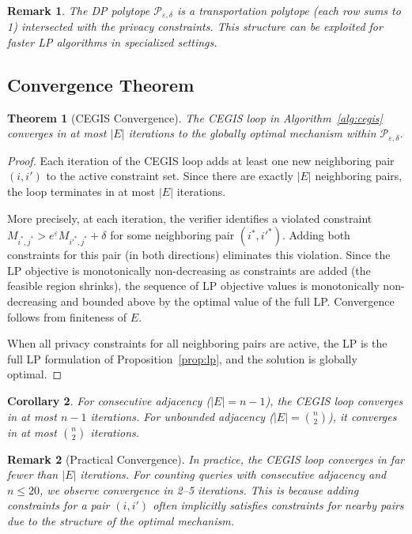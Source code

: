 \documentclass[11pt,a4paper]{article}
\newcommand{\eps}{\varepsilon}
\newcommand{\cP}{\mathcal{P}}
\newtheorem{theorem}{Theorem}[section]
\newtheorem{corollary}[theorem]{Corollary}
\newtheorem{remark}{Remark}[section]
\begin{document}
\begin{remark}
The DP polytope $\cP_{\eps,\delta}$ is a \emph{transportation polytope}
(each row sums to 1) intersected with the privacy constraints.  This structure
can be exploited for faster LP algorithms in specialized settings.
\end{remark}

\subsection{Convergence Theorem}
\label{subsec:convergence}

\begin{theorem}[CEGIS Convergence]
\label{thm:convergence}
The CEGIS loop in Algorithm~\ref{alg:cegis} converges in at most $|E|$
iterations to the globally optimal mechanism within $\cP_{\eps,\delta}$.
\end{theorem}

\begin{proof}
Each iteration of the CEGIS loop adds at least one new neighboring pair
$(i, i')$ to the active constraint set.  Since there are exactly $|E|$
neighboring pairs, the loop terminates in at most $|E|$ iterations.

More precisely, at each iteration, the verifier identifies a violated constraint
$M_{i^*,j^*} > e^{\eps} M_{i'^*,j^*} + \delta$ for some neighboring pair
$(i^*, i'^*)$.  Adding both constraints for this pair (in both directions)
eliminates this violation.  Since the LP objective is monotonically
non-decreasing as constraints are added (the feasible region shrinks), the
sequence of LP objective values is monotonically non-decreasing and bounded
above by the optimal value of the full LP.  Convergence follows from finiteness
of $E$.

When all privacy constraints for all neighboring pairs are active, the LP is
the full LP formulation of Proposition~\ref{prop:lp}, and the solution is
globally optimal.
\end{proof}

\begin{corollary}
For consecutive adjacency ($|E| = n-1$), the CEGIS loop converges in at most
$n-1$ iterations.  For unbounded adjacency ($|E| = \binom{n}{2}$), it converges
in at most $\binom{n}{2}$ iterations.
\end{corollary}

\begin{remark}[Practical Convergence]
In practice, the CEGIS loop converges in far fewer than $|E|$ iterations.
For counting queries with consecutive adjacency and $n \le 20$, we observe
convergence in 2--5 iterations.  This is because adding constraints for a
pair $(i, i')$ often implicitly satisfies constraints for nearby pairs due to
the structure of the optimal mechanism.
\end{remark}
\end{document}
